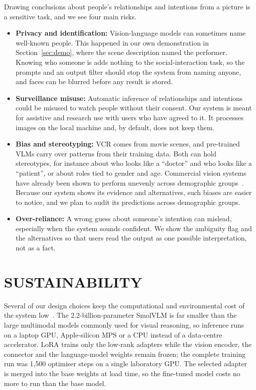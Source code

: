 Drawing conclusions about people's relationships and intentions from a picture is a sensitive task, and we see four main risks.
\begin{itemize}
\item \textbf{Privacy and identification:} Vision-language models can sometimes name well-known people. This happened in our own demonstration in Section~\ref{sec:demo}, where the scene description named the performer. Knowing who someone is adds nothing to the social-interaction task, so the prompts and an output filter should stop the system from naming anyone, and faces can be blurred before any result is stored.
\item \textbf{Surveillance misuse:} Automatic inference of relationships and intentions could be misused to watch people without their consent. Our system is meant for assistive and research use with users who have agreed to it. It processes images on the local machine and, by default, does not keep them.
\item \textbf{Bias and stereotyping:} VCR comes from movie scenes, and pre-trained VLMs carry over patterns from their training data. Both can hold stereotypes, for instance about who looks like a ``doctor'' and who looks like a ``patient'', or about roles tied to gender and age. Commercial vision systems have already been shown to perform unevenly across demographic groups~\cite{buolamwini2018gender}. Because our system shows its evidence and alternatives, such biases are easier to notice, and we plan to audit its predictions across demographic groups.
\item \textbf{Over-reliance:} A wrong guess about someone's intention can mislead, especially when the system sounds confident. We show the ambiguity flag and the alternatives so that users read the output as one possible interpretation, not as a fact.
\end{itemize}

\section{SUSTAINABILITY}

Several of our design choices keep the computational and environmental cost of the system low~\cite{strubell2019energy}. The 2.2-billion-parameter SmolVLM is far smaller than the large multimodal models commonly used for visual reasoning, so inference runs on a laptop GPU, Apple-silicon MPS or a CPU instead of a data-centre accelerator. LoRA trains only the low-rank adapters while the vision encoder, the connector and the language-model weights remain frozen; the complete training run was 1,500 optimiser steps on a single laboratory GPU. The selected adapter is merged into the base weights at load time, so the fine-tuned model costs no more to run than the base model.


